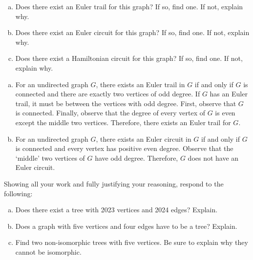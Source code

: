 \documentclass[11pt,letterpaper]{article}
\begin{document}
\begin{enumerate}[(a)]
\item Does there exist an Euler trail for this graph? If so, find one. If not, explain why.
\item Does there exist an Euler circuit for this graph? If so, find one. If not, explain why. 
\item Does there exist a Hamiltonian circuit for this graph? If so, find one. If not, explain why. 
\end{enumerate} \pspace

\sol 
\begin{enumerate}[(a)]
\item For an undirected graph $G$, there exists an Euler trail in $G$ if and only if $G$ is connected and there are exactly two vertices of odd degree. If $G$ has an Euler trail, it must be between the vertices with odd degree. First, observe that $G$ is connected. Finally, observe that the degree of every vertex of $G$ is even except the middle two vertices. Therefore, there exists an Euler trail for $G$. 

\item For an undirected graph $G$, there exists an Euler circuit in $G$ if and only if $G$ is connected and every vertex has positive even degree. Observe that the `middle' two vertices of $G$ have odd degree. Therefore, $G$ does not have an Euler circuit. 



\end{enumerate}



\newpage



 Showing all your work and fully justifying your reasoning, respond to the following:
	\begin{enumerate}[(a)]
	\item Does there exist a tree with 2023 vertices and 2024 edges? Explain. 
	\item Does a graph with five vertices and four edges have to be a tree? Explain.
	\item Find two non-isomorphic trees with five vertices. Be sure to explain why they cannot be isomorphic. 
	\end{enumerate}
\end{document}
